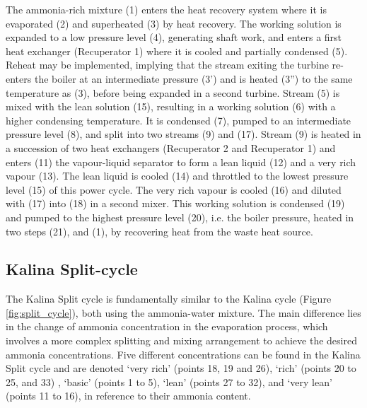 \documentclass[final,times,3p]{elsarticle}
\begin{document}
The ammonia-rich mixture (1) enters the heat recovery system where it is evaporated (2) and superheated (3) by heat recovery. The working solution is expanded to a low pressure level (4), generating shaft work, and enters a first heat exchanger (Recuperator 1) where it is cooled and partially condensed (5). Reheat may be implemented, implying that the stream exiting the turbine re-enters the boiler at an intermediate pressure (3') and is heated (3'') to the same temperature as (3), before being expanded in a second turbine. Stream (5) is mixed with the lean solution (15), resulting in a working solution (6) with a higher condensing temperature. It is condensed (7), pumped to an intermediate pressure level (8), and split into two streams (9) and (17). Stream (9) is heated in a succession of two heat exchangers (Recuperator 2 and Recuperator 1) and enters (11) the vapour-liquid separator to form a lean liquid (12) and a very rich vapour (13). The lean liquid is cooled (14) and throttled to the lowest pressure level (15) of this power cycle.  The very rich vapour is cooled (16) and diluted with (17) into (18) in a second mixer. This working solution is condensed (19) and pumped to the highest pressure level (20), i.e. the boiler pressure, heated in two steps (21), and (1), by recovering heat from the waste heat source. 

\subsection{Kalina Split-cycle}
\label{sec:split_cycle}

The Kalina Split cycle is fundamentally similar to the Kalina cycle (Figure \ref{fig:split_cycle}), both using the ammonia-water mixture. The main difference lies in the change of ammonia concentration in the evaporation process, which involves a more complex splitting and mixing arrangement to achieve the desired ammonia concentrations. Five different concentrations can be found in the Kalina Split cycle and are denoted `very rich' (points 18, 19 and 26), `rich' (points 20 to 25, and 33) , `basic' (points 1 to 5), `lean' (points 27 to 32), and  `very lean' (points 11 to 16), in reference to their ammonia content. 
\end{document}
